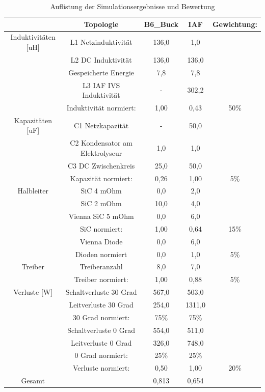 \begin{table}
\begin{tabular}{|c|c|c|c|c|}
	\hline
	& Topologie & B6\_Buck & IAF & Gewichtung: \\
	\hline
	Induktivitäten [uH] & L1 Netzinduktivität & 136,0 & 1,0 &  \\
	\hline
	& L2 DC Induktivität & 136,0 & 136,0 &  \\
	\hline
	& Gespeicherte Energie & 7,8 & 7,8 &  \\
	\hline
	& L3 IAF IVS Induktivität & - & 302,2 &  \\
	\hline
	& Induktivität normiert: & 1,00 & 0,43 & 50\% \\
	\hline
	Kapazitäten [uF] & C1 Netzkapazität & - & 50,0 &  \\
	\hline
	& C2 Kondensator am Elektrolyseur & 1,0 & 1,0 &  \\
	\hline
	& C3 DC Zwischenkreis & 25,0 & 50,0 &  \\
	\hline
	& Kapazität normiert: & 0,26 & 1,00 & 5\% \\
	\hline
	Halbleiter & SiC 4 mOhm & 0,0 & 2,0 &  \\
	\hline
	& SiC 2 mOhm & 10,0 & 4,0 &  \\
	\hline
	& Vienna SiC 5 mOhm & 0,0 & 6,0 &  \\
	\hline
	& SiC normiert: & 1,00 & 0,64 & 15\% \\
	\hline
	& Vienna Diode & 0,0 & 6,0 &  \\
	\hline
	& Dioden normiert & 0,0 & 1,0 & 5\% \\
	\hline
	Treiber & Treiberanzahl & 8,0 & 7,0 &  \\
	\hline
	& Treiber normiert: & 1,00 & 0,88 & 5\% \\
	\hline
	Verluste [W] & Schaltverluste 30 Grad & 567,0 & 503,0 &  \\
	\hline
	& Leitverluste 30 Grad & 254,0 & 1311,0 &  \\
	\hline
	& 30 Grad normiert: & 75\% & 75\% &  \\
	\hline
	& Schaltverluste 0 Grad & 554,0 & 511,0 &  \\
	\hline
	& Leitverluste 0 Grad & 326,0 & 748,0 &  \\
	\hline
	& 0 Grad normiert: & 25\% & 25\% &  \\
	\hline
	& Verluste normiert: & 0,50 & 1,00 & 20\% \\
	\hline
	Gesamt &  &  0,813 & 0,654 & \\
	\hline
\end{tabular}
\caption{Auflistung der Simulationsergebnisse und Bewertung}
\label{tab:Auswertung}
\end{table}


